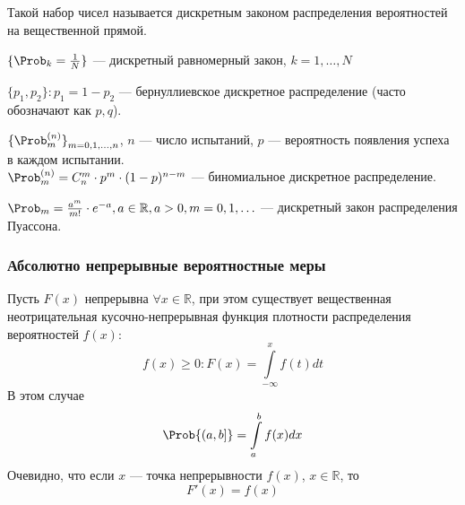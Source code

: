 Такой набор чисел называется дискретным законом распределения вероятностей на вещественной прямой.
\begin{example}
	$\{ \Prob_k = \frac{1}{N} \}$ --- дискретный равномерный закон, $k = 1, \ldots, N$
\end{example}
\begin{example}
	$\{ p_1, p_2 \} : p_1 = 1 - p_2$ --- бернуллиевское дискретное распределение (часто обозначают как $p, q$).
\end{example}
\begin{example}
	${ \{ {\Prob}_{m}^{ (n) } \} }_{m = 0, 1, \ldots, n}$, $n$ --- число испытаний, $p$ --- вероятность появления успеха в каждом испытании. \\
	$\Prob_m^{(n)} = C_n^m \cdot p^m \cdot (1 - p)^{n-m}$ --- биномиальное дискретное распределение.
\end{example}
\begin{example}
	$\Prob_m = \frac{a^m}{m!} \cdot e^{-a}, a \in \mathbb{R}, a > 0, m = 0, 1, \ldots$ --- дискретный закон распределения Пуассона.
\end{example}
\subsubsection{Абсолютно непрерывные вероятностные меры}
Пусть $F(x)$ непрерывна $\forall x \in \mathbb{R}$, при этом существует вещественная неотрицательная кусочно-непрерывная функция плотности распределения вероятностей $f(x)$:
\[
	f(x) \geqslant 0 : F(x) = \int\limits_{-\infty}^x f(t) dt
\]
В этом случае
\[
	\Prob \{ (a, b] \} = \int\limits_a^b f(x) dx
\]
Очевидно, что если $x$ --- точка непрерывности $f(x)$, $x \in \mathbb{R}$, то
\[
	F'(x) = f(x)
\]

